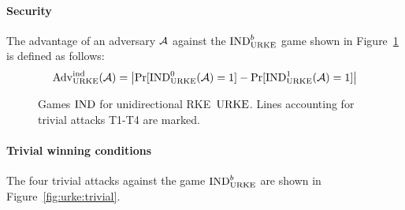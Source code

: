 \paragraph{Security} The advantage of an adversary $\mathcal{A}$ against the ${\mathrm{IND}}_{\mathrm{URKE}}^b$ game shown in Figure~\ref{fig:urke:ind} is defined as follows:
\[\mathrm{Adv}_{\mathrm{URKE}}^{\mathrm{ind}}(\mathcal{A}) = \left|\Pr[{\mathrm{IND}}_{\mathrm{URKE}}^0(\mathcal{A})=1] - \Pr[{\mathrm{IND}}_{\mathrm{URKE}}^1(\mathcal{A})=1]\right|\]

\begin{figure}[!ht]
    \centering
    \nicoresetlinenr%
    \fbox{%
        \scalebox{\codescalefactor}{%
        }%
    }
    \caption{%
        Games ${\mathrm{IND}}$ for unidirectional RKE~$\mathrm{URKE}$. Lines accounting for trivial attacks T1-T4 are marked.
    }
    \label{fig:urke:ind}
\end{figure}

\paragraph{Trivial winning conditions} The four trivial attacks against the game ${\mathrm{IND}}_{\mathrm{URKE}}^b$ are shown in Figure~\ref{fig:urke:trivial}.

